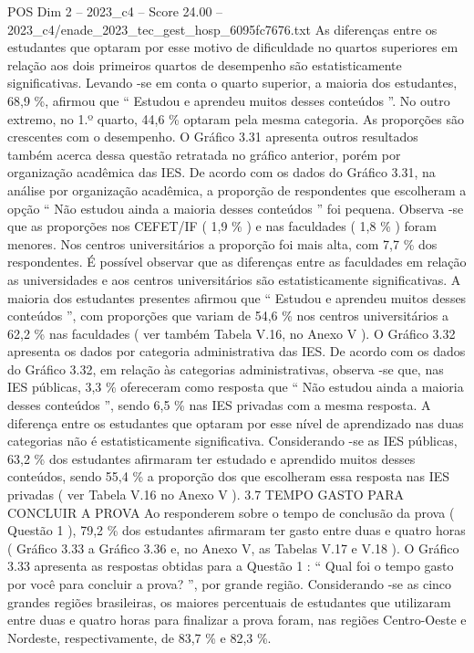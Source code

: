 \begin{textsample}{POS Dim 2 – 2023\_c4 – Score 24.00 – 2023\_c4/enade\_2023\_tec\_gest\_hosp\_6095fc7676.txt}
As diferenças entre os estudantes que optaram por esse motivo de dificuldade no quartos superiores em relação aos dois primeiros quartos de desempenho são estatisticamente significativas.
Levando -se em conta o quarto superior, a maioria dos estudantes, 68,9 \%, afirmou que “ Estudou e aprendeu muitos desses conteúdos ”.
No outro extremo, no 1.º quarto, 44,6 \% optaram pela mesma categoria.
As proporções são crescentes com o desempenho.
O Gráfico 3.31 apresenta outros resultados também acerca dessa questão retratada no gráfico anterior, porém por organização acadêmica das IES.
De acordo com os dados do Gráfico 3.31, na análise por organização acadêmica, a proporção de respondentes que escolheram a opção “ Não estudou ainda a maioria desses conteúdos ” foi pequena.
Observa -se que as proporções nos CEFET/IF ( 1,9 \% ) e nas faculdades ( 1,8 \% ) foram menores.
Nos centros universitários a proporção foi mais alta, com 7,7 \% dos respondentes.
É possível observar que as diferenças entre as faculdades em relação as universidades e aos centros universitários são estatisticamente significativas.
A maioria dos estudantes presentes afirmou que “ Estudou e aprendeu muitos desses conteúdos ”, com proporções que variam de 54,6 \% nos centros universitários a 62,2 \% nas faculdades ( ver também Tabela V.16, no Anexo V ).
O Gráfico 3.32 apresenta os dados por categoria administrativa das IES.
De acordo com os dados do Gráfico 3.32, em relação às categorias administrativas, observa -se que, nas IES públicas, 3,3 \% ofereceram como resposta que “ Não estudou ainda a maioria desses conteúdos ”, sendo 6,5 \% nas IES privadas com a mesma resposta.
A diferença entre os estudantes que optaram por esse nível de aprendizado nas duas categorias não é estatisticamente significativa.
Considerando -se as IES públicas, 63,2 \% dos estudantes afirmaram ter estudado e aprendido muitos desses conteúdos, sendo 55,4 \% a proporção dos que escolheram essa resposta nas IES privadas ( ver Tabela V.16 no Anexo V ). 3.7 TEMPO GASTO PARA CONCLUIR A PROVA Ao responderem sobre o tempo de conclusão da prova ( Questão 1 ), 79,2 \% dos estudantes afirmaram ter gasto entre duas e quatro horas ( Gráfico 3.33 a Gráfico 3.36 e, no Anexo V, as Tabelas V.17 e V.18 ).
O Gráfico 3.33 apresenta as respostas obtidas para a Questão 1 : “ Qual foi o tempo gasto por você para concluir a prova? ”, por grande região.
Considerando -se as cinco grandes regiões brasileiras, os maiores percentuais de estudantes que utilizaram entre duas e quatro horas para finalizar a prova foram, nas regiões Centro-Oeste e Nordeste, respectivamente, de 83,7 \% e 82,3 \%.

\end{textsample}
